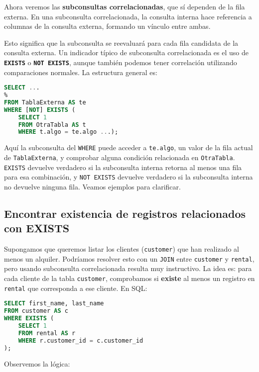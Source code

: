 \documentclass[12pt,a4paper]{article}
\begin{document}
Ahora veremos las \textbf{subconsultas correlacionadas}, que sí dependen de la fila externa.
%
En una subconsulta correlacionada, la consulta interna hace referencia a columnas de la consulta externa, formando un vínculo entre ambas.


Esto significa que la subconsulta se reevaluará para cada fila candidata de la consulta externa.
%
Un indicador típico de subconsulta correlacionada es el uso de \textbf{\texttt{EXISTS}} o \textbf{\texttt{NOT EXISTS}}, aunque también podemos tener correlación utilizando comparaciones normales.
%
La estructura general es:



\begin{lstlisting}[language=SQL]
SELECT ...
%
FROM TablaExterna AS te
WHERE [NOT] EXISTS (
	SELECT 1
	FROM OtraTabla AS t
	WHERE t.algo = te.algo ...);
\end{lstlisting}


Aquí la subconsulta del \texttt{WHERE} puede acceder a \texttt{te.algo}, un valor de la fila actual de \texttt{TablaExterna}, y comprobar alguna condición relacionada en \texttt{OtraTabla}. \texttt{EXISTS} devuelve verdadero si la subconsulta interna retorna al menos una fila para esa combinación, y \texttt{NOT EXISTS} devuelve verdadero si la subconsulta interna no devuelve ninguna fila.
%
Veamos ejemplos para clarificar. 



\subsection*{Encontrar existencia de registros relacionados con EXISTS} Supongamos que queremos listar los clientes (\texttt{customer}) que han realizado al menos un alquiler.
%
Podríamos resolver esto con un \texttt{JOIN} entre \texttt{customer} y \texttt{rental}, pero usando subconsulta correlacionada resulta muy instructivo.
%
La idea es: para cada cliente de la tabla \texttt{customer}, comprobamos si \textbf{existe} al menos un registro en \texttt{rental} que corresponda a ese cliente.
%
En SQL: 


\begin{lstlisting}[language=SQL]
SELECT first_name, last_name
FROM customer AS c
WHERE EXISTS (
	SELECT 1
	FROM rental AS r
	WHERE r.customer_id = c.customer_id
);
\end{lstlisting}


Observemos la lógica:
\end{document}
